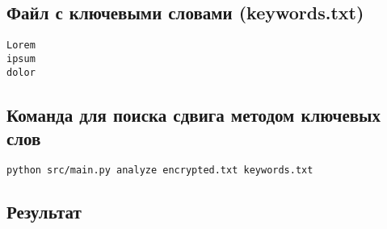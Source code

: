 \documentclass[a4paper, 14pt]{report}
\begin{document}
\subsection{Файл с ключевыми словами (keywords.txt)}
\begin{lstlisting}
Lorem 
ipsum 
dolor
\end{lstlisting}

\subsection{Команда для поиска сдвига методом ключевых слов}
\begin{lstlisting}[language=bash]
python src/main.py analyze encrypted.txt keywords.txt
\end{lstlisting}

\subsection{Результат}
\end{document}
